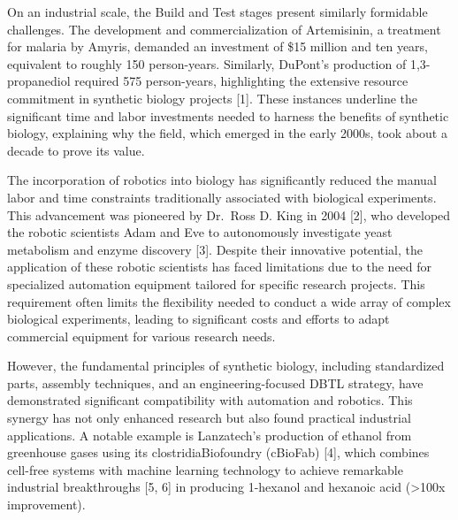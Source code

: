 \documentclass[
  letterpaper,
]{book}
\begin{document}
On an industrial scale, the Build and Test stages present similarly
formidable challenges. The development and commercialization of
Artemisinin, a treatment for malaria by Amyris, demanded an investment
of \$15 million and ten years, equivalent to roughly 150 person-years.
Similarly, DuPont's production of 1,3-propanediol required 575
person-years, highlighting the extensive resource commitment in
synthetic biology projects {[}1{]}. These instances underline the
significant time and labor investments needed to harness the benefits of
synthetic biology, explaining why the field, which emerged in the early
2000s, took about a decade to prove its value.

The incorporation of robotics into biology has significantly reduced the
manual labor and time constraints traditionally associated with
biological experiments. This advancement was pioneered by Dr.~Ross D.
King in 2004 {[}2{]}, who developed the robotic scientists Adam and Eve
to autonomously investigate yeast metabolism and enzyme discovery
{[}3{]}. Despite their innovative potential, the application of these
robotic scientists has faced limitations due to the need for specialized
automation equipment tailored for specific research projects. This
requirement often limits the flexibility needed to conduct a wide array
of complex biological experiments, leading to significant costs and
efforts to adapt commercial equipment for various research needs.

However, the fundamental principles of synthetic biology, including
standardized parts, assembly techniques, and an engineering-focused DBTL
strategy, have demonstrated significant compatibility with automation
and robotics. This synergy has not only enhanced research but also found
practical industrial applications. A notable example is Lanzatech's
production of ethanol from greenhouse gases using its
clostridiaBiofoundry (cBioFab) {[}4{]}, which combines cell-free systems
with machine learning technology to achieve remarkable industrial
breakthroughs {[}5, 6{]} in producing 1-hexanol and hexanoic acid
(\textgreater100x improvement).
\end{document}
